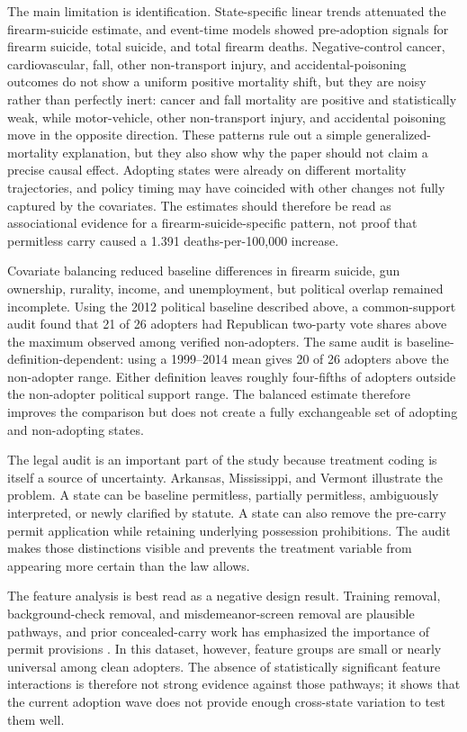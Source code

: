 \documentclass[11pt]{article}
\begin{document}
The main limitation is identification. State-specific linear trends attenuated the firearm-suicide estimate, and event-time models showed pre-adoption signals for firearm suicide, total suicide, and total firearm deaths. Negative-control cancer, cardiovascular, fall, other non-transport injury, and accidental-poisoning outcomes do not show a uniform positive mortality shift, but they are noisy rather than perfectly inert: cancer and fall mortality are positive and statistically weak, while motor-vehicle, other non-transport injury, and accidental poisoning move in the opposite direction. These patterns rule out a simple generalized-mortality explanation, but they also show why the paper should not claim a precise causal effect. Adopting states were already on different mortality trajectories, and policy timing may have coincided with other changes not fully captured by the covariates. The estimates should therefore be read as associational evidence for a firearm-suicide-specific pattern, not proof that permitless carry caused a 1.391 deaths-per-100,000 increase.

Covariate balancing reduced baseline differences in firearm suicide, gun ownership, rurality, income, and unemployment, but political overlap remained incomplete. Using the 2012 political baseline described above, a common-support audit found that 21 of 26 adopters had Republican two-party vote shares above the maximum observed among verified non-adopters. The same audit is baseline-definition-dependent: using a 1999--2014 mean gives 20 of 26 adopters above the non-adopter range. Either definition leaves roughly four-fifths of adopters outside the non-adopter political support range. The balanced estimate therefore improves the comparison but does not create a fully exchangeable set of adopting and non-adopting states.

The legal audit is an important part of the study because treatment coding is itself a source of uncertainty. Arkansas, Mississippi, and Vermont illustrate the problem. A state can be baseline permitless, partially permitless, ambiguously interpreted, or newly clarified by statute. A state can also remove the pre-carry permit application while retaining underlying possession prohibitions. The audit makes those distinctions visible and prevents the treatment variable from appearing more certain than the law allows.

The feature analysis is best read as a negative design result. Training removal, background-check removal, and misdemeanor-screen removal are plausible pathways, and prior concealed-carry work has emphasized the importance of permit provisions \citep{doucette2023}. In this dataset, however, feature groups are small or nearly universal among clean adopters. The absence of statistically significant feature interactions is therefore not strong evidence against those pathways; it shows that the current adoption wave does not provide enough cross-state variation to test them well.
\end{document}
